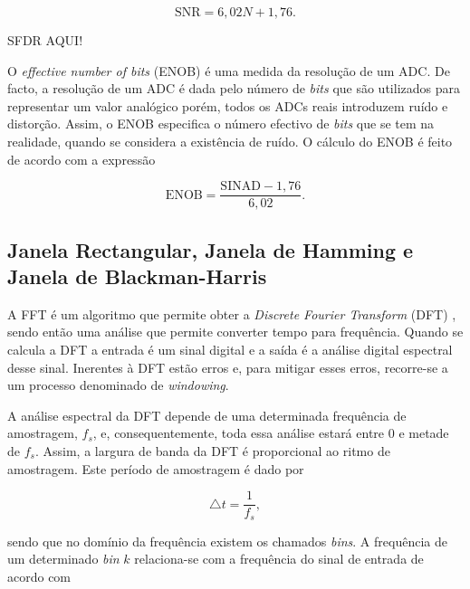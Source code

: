 \documentclass[11pt]{article}
\numberwithin{equation}{section}
\begin{document}
\vspace{-3mm}
\begin{equation}
\text{SNR} = 6,02N + 1,76.
\label{eq:SNR}
\end{equation}

\vspace{1mm}
SFDR AQUI!


O \textit{effective number of bits} (ENOB) é uma medida da resolução de um ADC. De facto, a resolução de um ADC é dada pelo número de \textit{bits} que são utilizados para representar um valor analógico porém, todos os ADCs reais introduzem ruído e distorção. Assim, o ENOB especifica o número efectivo de \textit{bits} que se tem na realidade, quando se considera a existência de ruído. O cálculo do ENOB é feito de acordo com a expressão

\vspace{-3mm}
\begin{equation}
\text{ENOB} = \frac{\text{SINAD}-1,76}{6,02}.
\label{eq:ENOB}
\end{equation}

\subsection{Janela Rectangular, Janela de Hamming e Janela de Blackman-Harris}

A FFT é um algoritmo que permite obter a \textit{Discrete Fourier Transform} (DFT) , sendo então uma análise que permite converter tempo para frequência. Quando se calcula a DFT a entrada é um sinal digital e a saída é a análise digital espectral desse sinal. Inerentes à DFT estão erros e, para mitigar esses erros, recorre-se a um processo denominado de \textit{windowing}.

A análise espectral da DFT depende de uma determinada frequência de amostragem, $f_{s}$, e, consequentemente, toda essa análise estará entre $0$ e metade de $f_{s}$. Assim, a largura de banda da DFT é proporcional ao ritmo de amostragem. Este período de amostragem é dado por

\vspace{-3mm}
\begin{equation}
\bigtriangleup t = \frac{1}{f_{s}},
\end{equation}

\vspace{1mm}
sendo que no domínio da frequência existem os chamados \textit{bins}. A frequência de um determinado \textit{bin} $k$ relaciona-se com a frequência do sinal de entrada de acordo com
\end{document}
